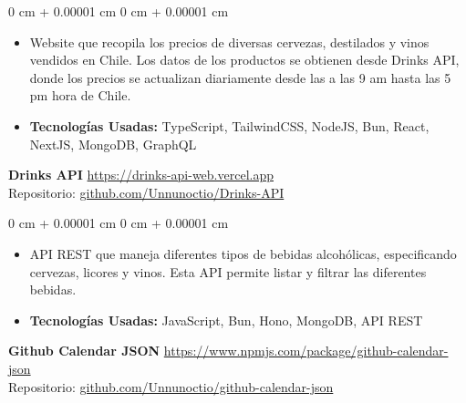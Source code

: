 \documentclass[10pt, letterpaper]{article}
\newenvironment{highlights}{
    \begin{itemize}[
        topsep=0.10 cm,
        parsep=0.10 cm,
        partopsep=0pt,
        itemsep=0pt,
        leftmargin=0 cm + 10pt
    ]
}{
    \end{itemize}
} %
\newenvironment{onecolentry}{
    \begin{adjustwidth}{
        0 cm + 0.00001 cm
    }{
        0 cm + 0.00001 cm
    }
}{
    \end{adjustwidth}
} %
\newlength{\itemSeparate}
\newlength{\blockSeparate}
\begin{document}
        \vspace{\itemSeparate}
        \begin{onecolentry}
            \begin{highlights}
                \item Website que recopila los precios de diversas cervezas, destilados y vinos vendidos en Chile. Los datos de los productos se obtienen desde Drinks API, donde los precios se actualizan diariamente desde las a las 9 am hasta las 5 pm hora de Chile.
                \item \textbf{Tecnologías Usadas:} TypeScript, TailwindCSS, NodeJS, Bun, React, NextJS, MongoDB, GraphQL
            \end{highlights}
        \end{onecolentry}

        \vspace{\blockSeparate}
        
        \textbf{Drinks API}
        \hspace{299pt}
        \href{https://drinks-api-web.vercel.app}{https://drinks-api-web.vercel.app}
        \\Repositorio: \href{https://github.com/Unnunoctio/Drinks-API}{github.com/Unnunoctio/Drinks-API}

        \vspace{\itemSeparate}
        \begin{onecolentry}
            \begin{highlights}
                \item API REST que maneja diferentes tipos de bebidas alcohólicas, especificando cervezas, licores y vinos. Esta API permite listar y filtrar las diferentes bebidas.
                \item \textbf{Tecnologías Usadas:} JavaScript, Bun, Hono, MongoDB, API REST
            \end{highlights}
        \end{onecolentry}

        \vspace{\blockSeparate}

        \textbf{Github Calendar JSON}
        \hspace{150pt}
        \href{https://www.npmjs.com/package/github-calendar-json}{https://www.npmjs.com/package/github-calendar-json}
        \\Repositorio: \href{https://github.com/Unnunoctio/github-calendar-json}{github.com/Unnunoctio/github-calendar-json}
\end{document}
